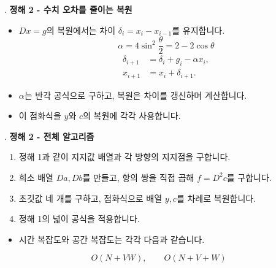 \begin{frame}{\textbf{\pletter}. \ptitle}
    \textbf{정해 2 - 수치 오차를 줄이는 복원}
    \begin{itemize}
        \item $Dx=g$의 복원에서는 차이 $\delta_i=x_i-x_{i-1}$를 유지합니다.
        \[
            \alpha=4\sin^2\frac\theta2=2-2\cos\theta
        \]
        \[
            \begin{aligned}
                \delta_{i+1}&=\delta_i+g_i-\alpha x_i,\\
                x_{i+1}&=x_i+\delta_{i+1}.
            \end{aligned}
        \]
        \item $\alpha$는 반각 공식으로 구하고, 복원은 차이를 갱신하며 계산합니다.
        \item 이 점화식을 $y$와 $c$의 복원에 각각 사용합니다.
    \end{itemize}
\end{frame}

\begin{frame}{\textbf{\pletter}. \ptitle}
    \textbf{정해 2 - 전체 알고리즘}
    \begin{enumerate}
        \item 정해 1과 같이 지지값 배열과 각 방향의 지지점을 구합니다.
        \item 희소 배열 $Da,Db$를 만들고, 항의 쌍을 직접 곱해 $f=D^2c$를 구합니다.
        \item 초깃값 네 개를 구하고, 점화식으로 배열 $y,c$를 차례로 복원합니다.
        \item 정해 1의 넓이 공식을 적용합니다.
    \end{enumerate}
    \begin{itemize}
        \item 시간 복잡도와 공간 복잡도는 각각 다음과 같습니다.
    \end{itemize}
    \[
        \boxed{O(N+VW)},\qquad
        \boxed{O(N+V+W)}
    \]
\end{frame}

